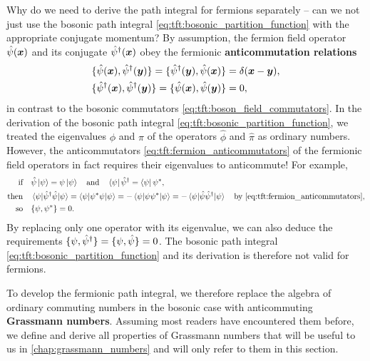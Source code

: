 Why do we need to derive the path integral for fermions separately -- can we not just use the bosonic path integral \eqref{eq:tft:bosonic_partition_function} with the appropriate conjugate momentum?
By assumption, the fermion field operator $\hat\psi({\bm{x}})$ and its conjugate $\hat\psi^\dagger({\bm{x}})$ obey the fermionic \textbf{anticommutation relations}
\begin{equation}
\begin{split}
	\{ \hat\psi({\bm{x}}) , \hat\psi^\dagger({\bm{y}}) \} = \{ \hat\psi^\dagger({\bm{y}}) , \hat\psi({\bm{x}}) \} &= \delta({\bm{x}}-{\bm{y}}) , \\
	\{ \hat\psi^\dagger({\bm{x}}) , \hat\psi^\dagger({\bm{y}}) \} = \{ \hat\psi({\bm{x}}) , \hat\psi({\bm{y}}) \} &= 0 ,
\end{split}
\label{eq:tft:fermion_anticommutators}
\end{equation}
in contrast to the bosonic commutators \eqref{eq:tft:boson_field_commutators}.
In the derivation of the bosonic path integral \eqref{eq:tft:bosonic_partition_function}, we treated the eigenvalues $\phi$ and $\pi$ of the operators $\hat\phi$ and $\hat\pi$ as ordinary numbers.
However, the anticommutators \eqref{eq:tft:fermion_anticommutators} of the fermionic field operators in fact requires their eigenvalues to anticommute!
For example,
\begin{equation}
\begin{split}
	\text{if}   \quad & \hat\psi \ket{\psi} = \psi \ket{\psi} \quad \text{and} \quad \bra{\psi} \hat\psi^\dagger = \bra{\psi} {\psi}^* , \\
	\text{then} \quad & \braket{\psi | \hat\psi^\dagger \hat\psi | \psi} = \braket{\psi | {\psi}^* \psi | \psi} = -\braket{\psi | \psi {\psi}^* | \psi} = -\braket{\psi | \hat\psi \hat\psi^\dagger | \psi} \quad \text{by \eqref{eq:tft:fermion_anticommutators}}, \\
	\text{so}   \quad & \{ \psi , {\psi}^* \} = 0 . \\
\end{split}
\label{eq:tft:eigenvalues_must_anticommute}
\end{equation}
By replacing only one operator with its eigenvalue, we can also deduce the requirements $\{ \psi , \hat\psi^\dagger \} = \{ \psi , \hat\psi \} = 0$.
The bosonic path integral \eqref{eq:tft:bosonic_partition_function} and its derivation is therefore not valid for fermions.

To develop the fermionic path integral, we therefore replace the algebra of ordinary commuting numbers in the bosonic case with anticommuting \textbf{Grassmann numbers}.
Assuming most readers have encountered them before, we define and derive all properties of Grassmann numbers that will be useful to us in \cref{chap:grassmann_numbers} and will only refer to them in this section.

